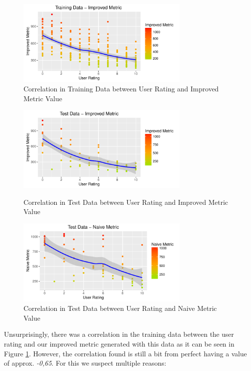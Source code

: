 \documentclass{sig-alternate-05-2015}
\begin{document}
\begin{figure}[b]
\centering
\includegraphics[width=8.45cm]{TrainingDataImproved}
\vspace{-20pt}
\caption{Correlation in Training Data between User Rating and Improved Metric Value}
\label{fig:trainingData}
\vspace{-10pt}
\end{figure}

\begin{figure}[t]
\centering
\includegraphics[width=8.45cm]{TestDataImproved}
\vspace{-20pt}
\caption{Correlation in Test Data between User Rating and Improved Metric Value}
\vspace{-10pt}
\label{fig:testData}

\includegraphics[width=8.45cm]{TestDataNaive}
\vspace{-20pt}
\caption{Correlation in Test Data between User Rating and Naive Metric Value}
\label{fig:testDataNaive}
\vspace{-20pt}
\end{figure}


Unsurprisingly, there was a correlation in the training data between the user rating and our improved metric generated with this data as it can be seen in Figure \ref{fig:trainingData}. However, the correlation found is still a bit from perfect having a value of approx. \textsl{-0,65}. For this we suspect multiple reasons: 
\end{document}

